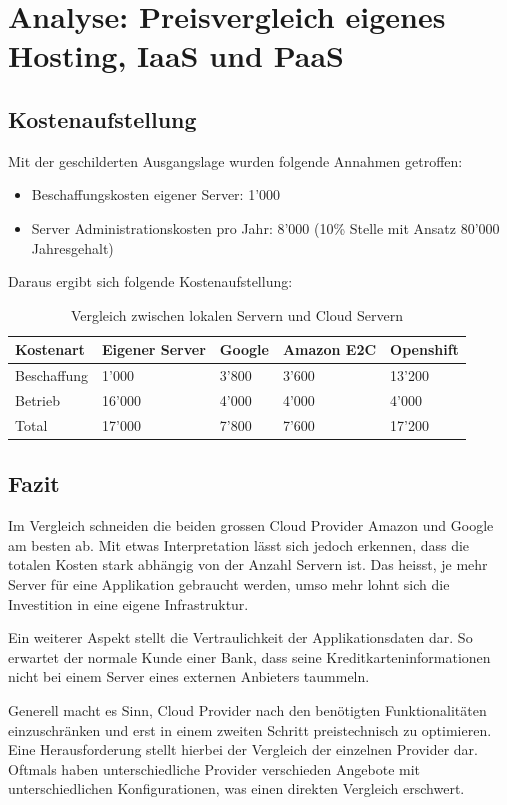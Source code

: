 \documentclass[12pt,a4paper]{article}
\begin{document}
\section{Analyse: Preisvergleich eigenes Hosting, IaaS und PaaS}

\subsection{Kostenaufstellung}
Mit der geschilderten Ausgangslage wurden folgende Annahmen getroffen:

\begin{itemize}
	\item Beschaffungskosten eigener Server: 1'000
	\item Server Administrationskosten pro Jahr: 8'000 (10\% Stelle mit Ansatz 80'000 Jahresgehalt)
\end{itemize}

Daraus ergibt sich folgende Kostenaufstellung:

\begin{table}[H]
    \begin{tabular}{| l | l | l | l | l |}
		\hline
        Kostenart & Eigener Server & Google & Amazon E2C & Openshift \\ \hline
        Beschaffung & 1'000 & 3'800 & 3'600 & 13'200\\
        Betrieb & 16'000 & 4'000 & 4'000 & 4'000\\
        Total & 17'000 & 7'800 & 7'600 & 17'200 \\ \hline
    \end{tabular}
    \caption{Vergleich zwischen lokalen Servern und Cloud Servern}
\end{table}

\subsection{Fazit}
Im Vergleich schneiden die beiden grossen Cloud Provider Amazon und Google am besten ab. Mit etwas Interpretation lässt sich jedoch erkennen, dass die totalen Kosten stark abhängig von der Anzahl Servern ist.
Das heisst, je mehr Server für eine Applikation gebraucht werden, umso mehr lohnt sich die Investition in eine eigene Infrastruktur.

Ein weiterer Aspekt stellt die Vertraulichkeit der Applikationsdaten dar. So erwartet der normale Kunde einer Bank, dass seine Kreditkarteninformationen nicht bei einem Server eines externen Anbieters taummeln.

Generell macht es Sinn, Cloud Provider nach den benötigten Funktionalitäten einzuschränken und erst in einem zweiten Schritt preistechnisch zu optimieren. Eine Herausforderung stellt hierbei der Vergleich der einzelnen Provider dar.
Oftmals haben unterschiedliche Provider verschieden Angebote mit unterschiedlichen Konfigurationen, was einen direkten Vergleich erschwert.
\end{document}
